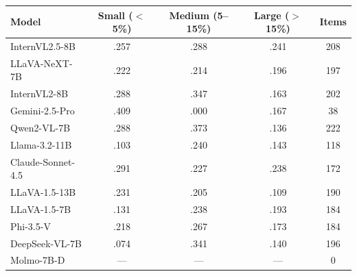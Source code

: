 \begin{tabular}{@{}lcccc@{}}
\toprule
Model & Small ($<$5\%) & Medium (5--15\%) & Large ($>$15\%) & Items \\
\midrule
InternVL2.5-8B & .257 & .288 & .241 & 208 \\
LLaVA-NeXT-7B & .222 & .214 & .196 & 197 \\
InternVL2-8B & .288 & .347 & .163 & 202 \\
Gemini-2.5-Pro & .409 & .000 & .167 & 38 \\
Qwen2-VL-7B & .288 & .373 & .136 & 222 \\
Llama-3.2-11B & .103 & .240 & .143 & 118 \\
Claude-Sonnet-4.5 & .291 & .227 & .238 & 172 \\
LLaVA-1.5-13B & .231 & .205 & .109 & 190 \\
LLaVA-1.5-7B & .131 & .238 & .193 & 184 \\
Phi-3.5-V & .218 & .267 & .173 & 184 \\
DeepSeek-VL-7B & .074 & .341 & .140 & 196 \\
Molmo-7B-D & --- & --- & --- & 0 \\
\bottomrule
\end{tabular}